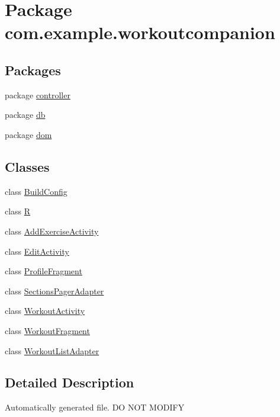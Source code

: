 \hypertarget{namespacecom_1_1example_1_1workoutcompanion}{\section{Package com.\-example.\-workoutcompanion}
\label{namespacecom_1_1example_1_1workoutcompanion}
}
\subsection*{Packages}
\begin{DoxyCompactItemize}
\item 
package \hyperlink{namespacecom_1_1example_1_1workoutcompanion_1_1controller}{controller}
\item 
package \hyperlink{namespacecom_1_1example_1_1workoutcompanion_1_1db}{db}
\item 
package \hyperlink{namespacecom_1_1example_1_1workoutcompanion_1_1dom}{dom}
\end{DoxyCompactItemize}
\subsection*{Classes}
\begin{DoxyCompactItemize}
\item 
class \hyperlink{classcom_1_1example_1_1workoutcompanion_1_1_build_config}{Build\-Config}
\item 
class \hyperlink{classcom_1_1example_1_1workoutcompanion_1_1_r}{R}
\item 
class \hyperlink{classcom_1_1example_1_1workoutcompanion_1_1_add_exercise_activity}{Add\-Exercise\-Activity}
\item 
class \hyperlink{classcom_1_1example_1_1workoutcompanion_1_1_edit_activity}{Edit\-Activity}
\item 
class \hyperlink{classcom_1_1example_1_1workoutcompanion_1_1_profile_fragment}{Profile\-Fragment}
\item 
class \hyperlink{classcom_1_1example_1_1workoutcompanion_1_1_sections_pager_adapter}{Sections\-Pager\-Adapter}
\item 
class \hyperlink{classcom_1_1example_1_1workoutcompanion_1_1_workout_activity}{Workout\-Activity}
\item 
class \hyperlink{classcom_1_1example_1_1workoutcompanion_1_1_workout_fragment}{Workout\-Fragment}
\item 
class \hyperlink{classcom_1_1example_1_1workoutcompanion_1_1_workout_list_adapter}{Workout\-List\-Adapter}
\end{DoxyCompactItemize}


\subsection{Detailed Description}
Automatically generated file. D\-O N\-O\-T M\-O\-D\-I\-F\-Y 